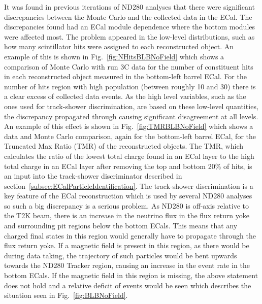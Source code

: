 It was found in previous iterations of ND280 analyses that there were significant discrepancies between the Monte Carlo and the collected data in the ECal.  The discrepancies found had an ECal module dependence where the bottom modules were affected most.  The problem appeared in the low-level distributions, such as how many scintillator hits were assigned to each reconstructed object.  An example of this is shown in Fig.~\ref{fig:NHitsBLBNoField} which shows a comparison of Monte Carlo with run 3C data for the number of constituent hits in each reconstructed object measured in the bottom-left barrel ECal.  For the number of hits region with high population (between roughly 10 and 30) there is a clear excess of collected data events.  As the high level variables, such as the ones used for track-shower discrimination, are based on these low-level quantities, the discrepancy propagated through causing significant disagreement at all levels.  An example of this effect is shown in Fig.~\ref{fig:TMRBLBNoField} which shows a data and Monte Carlo comparison, again for the bottom-left barrel ECal, for the Truncated Max Ratio (TMR) of the reconstructed objects.  The TMR, which calculates the ratio of the lowest total charge found in an ECal layer to the high total charge in an ECal layer after removing the top and bottom 20$\%$ of hits, is an input into the track-shower discriminator described in section~\ref{subsec:ECalParticleIdentification}.  The track-shower discrimination is a key feature of the ECal reconstruction which is used by several ND280 analyses so such a big discrepancy is a serious problem.
\newline
\newline
As ND280 is off-axis relative to the T2K beam, there is an increase in the neutrino flux in the flux return yoke and surrounding pit regions below the bottom ECals.  This means that any charged final states in this region would generally have to propagate through the flux return yoke.  If a magnetic field is present in this region, as there would be during data taking, the trajectory of such particles would be bent upwards towards the ND280 Tracker region, causing an increase in the event rate in the bottom ECals.  If the magnetic field in this region is missing, the above statement does not hold and a relative deficit of events would be seen which describes the situation seen in Fig.~\ref{fig:BLBNoField}.
